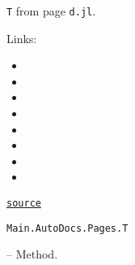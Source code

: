 \begin{adjustwidth}{2em}{0pt}

\texttt{T} from page \texttt{d.jl}.

Links:

\begin{itemize}
\item {}


\item {}


\item {}


\item {}


\item {}


\item {}


\item {}


\item {}

\end{itemize}


\href{https://github.com/BambOoxX/Documenter.jl/blob/d157febde213549ed0d45c894f0651560da477d3/test/examples/pages/d.jl#L2-L16}{\texttt{source}}


\end{adjustwidth}
\hypertarget{14050452459487205641}{\texttt{Main.AutoDocs.Pages.T}}  -- {Method.}

